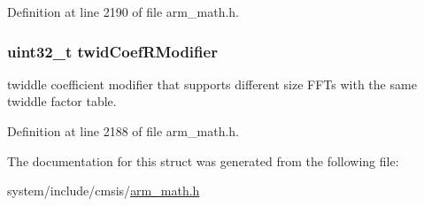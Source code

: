 Definition at line 2190 of file arm\+\_\+math.\+h.

\subsubsection[{\texorpdfstring{twid\+Coef\+R\+Modifier}{twidCoefRModifier}}]{\setlength{\rightskip}{0pt plus 5cm}uint32\+\_\+t twid\+Coef\+R\+Modifier}\hypertarget{structarm__rfft__instance__q31_a5b06f7f76c018db993fe6acc5708c589}{}\label{structarm__rfft__instance__q31_a5b06f7f76c018db993fe6acc5708c589}
twiddle coefficient modifier that supports different size F\+F\+Ts with the same twiddle factor table. 

Definition at line 2188 of file arm\+\_\+math.\+h.



The documentation for this struct was generated from the following file\+:\begin{DoxyCompactItemize}
\item 
system/include/cmsis/\hyperlink{arm__math_8h}{arm\+\_\+math.\+h}\end{DoxyCompactItemize}
